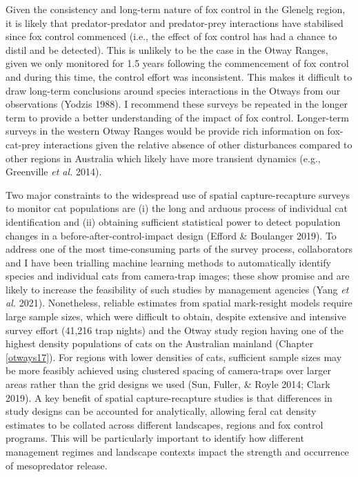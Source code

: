 \documentclass[11pt,a4paper,titlepage,twoside,openright]{style/unimelbthesis}
\begin{document}
\begin{mainmatter}
Given the consistency and long-term nature of fox control in the Glenelg region, it is likely that predator-predator and predator-prey interactions have stabilised since fox control commenced (i.e., the effect of fox control has had a chance to distil and be detected). This is unlikely to be the case in the Otway Ranges, given we only monitored for 1.5 years following the commencement of fox control and during this time, the control effort was inconsistent. This makes it difficult to draw long-term conclusions around species interactions in the Otways from our observations (Yodzis 1988). I recommend these surveys be repeated in the longer term to provide a better understanding of the impact of fox control. Longer-term surveys in the western Otway Ranges would be provide rich information on fox-cat-prey interactions given the relative absence of other disturbances compared to other regions in Australia which likely have more transient dynamics (e.g., Greenville \emph{et al.} 2014).

Two major constraints to the widespread use of spatial capture-recapture surveys to monitor cat populations are (i) the long and arduous process of individual cat identification and (ii) obtaining sufficient statistical power to detect population changes in a before-after-control-impact design (Efford \& Boulanger 2019). To address one of the most time-consuming parts of the survey process, collaborators and I have been trialling machine learning methods to automatically identify species and individual cats from camera-trap images; these show promise and are likely to increase the feasibility of such studies by management agencies (Yang \emph{et al.} 2021). Nonetheless, reliable estimates from spatial mark-resight models require large sample sizes, which were difficult to obtain, despite extensive and intensive survey effort (41,216 trap nights) and the Otway study region having one of the highest density populations of cats on the Australian mainland (Chapter \ref{otways17}). For regions with lower densities of cats, sufficient sample sizes may be more feasibly achieved using clustered spacing of camera-traps over larger areas rather than the grid designs we used (Sun, Fuller, \& Royle 2014; Clark 2019). A key benefit of spatial capture-recapture studies is that differences in study designs can be accounted for analytically, allowing feral cat density estimates to be collated across different landscapes, regions and fox control programs. This will be particularly important to identify how different management regimes and landscape contexts impact the strength and occurrence of mesopredator release.


\end{mainmatter}
\end{document}
